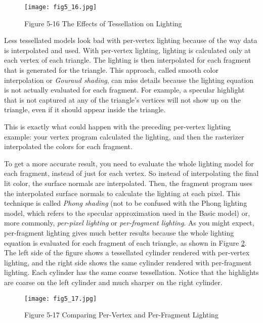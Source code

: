 \documentclass[../main.tex]{subfiles}
\begin{document}
\begin{figure}
    \centering
    \texttt{[image: fig5\_16.jpg]}
    \caption{Figure 5-16 The Effects of Tessellation on Lighting}
    \label{fig:5-16}
\end{figure}

Less tessellated models look bad with per-vertex lighting because of the way data is interpolated and used. With per-vertex lighting, lighting is calculated only at each vertex of each triangle. The lighting is then interpolated for each fragment that is generated for the triangle. This approach, called smooth color interpolation or \textit{Gouraud shading}, can miss details because the lighting equation is not actually evaluated for each fragment. For example, a specular highlight that is not captured at any of the triangle's vertices will not show up on the triangle, even if it should appear inside the triangle.

This is exactly what could happen with the preceding per-vertex lighting example: your vertex program calculated the lighting, and then the rasterizer interpolated the colors for each fragment.

To get a more accurate result, you need to evaluate the whole lighting model for each fragment, instead of just for each vertex. So instead of interpolating the final lit color, the surface normals are interpolated. Then, the fragment program uses the interpolated surface normals to calculate the lighting at each pixel. This technique is called \textit{Phong shading} (not to be confused with the Phong lighting model, which refers to the specular approximation used in the Basic model) or, more commonly, \textit{per-pixel lighting} or \textit{per-fragment lighting}. As you might expect, per-fragment lighting gives much better results because the whole lighting equation is evaluated for each fragment of each triangle, as shown in Figure \ref{fig:5-17}. The left side of the figure shows a tessellated cylinder rendered with per-vertex lighting, and the right side shows the same cylinder rendered with per-fragment lighting. Each cylinder has the same coarse tessellation. Notice that the highlights are coarse on the left cylinder and much sharper on the right cylinder.

\begin{figure}
    \centering
    \texttt{[image: fig5\_17.jpg]}
    \caption{Figure 5-17 Comparing Per-Vertex and Per-Fragment Lighting}
    \label{fig:5-17}
\end{figure}
\end{document}
